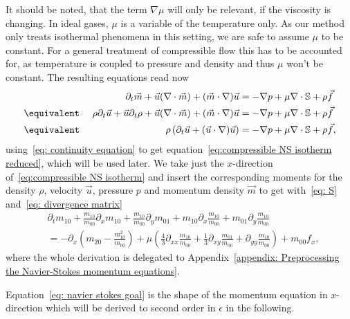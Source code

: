 It should be noted, that the term $\nabla \mu$ will only be relevant, if the viscosity is changing.
In ideal gases, $\mu$ is a variable of the temperature only.
As our method only treats isothermal phenomena in this setting, we are safe to assume $\mu$ to be constant.
For a general treatment of compressible flow this has to be accounted for, as temperature is coupled to pressure and density and thus $\mu$ won't be constant.
The resulting equations read now
\begin{alignat}{3}
  \label{eq:compressible NS isotherm}
  &&\partial_t \vec{m} + \vec{u}(\nabla \cdot \vec{m}) + (\vec{m} \cdot \nabla)\vec{u}
    &= - \nabla p + \mu \nabla \cdot \mathbb{S} + \rho \vec{f}\\
  \nonumber
  &\equivalent\ & \rho\partial_t \vec{u} + \vec{u}\partial_t \rho + \vec{u}(\nabla \cdot \vec{m}) + (\vec{m} \cdot \nabla)\vec{u}
    &= - \nabla p + \mu \nabla \cdot \mathbb{S} + \rho \vec{f}\\
  \label{eq:compressible NS isotherm reduced}
  &\equivalent& \rho\left(\partial_t \vec{u} + (\vec{u} \cdot \nabla)\vec{u}\right)
    &= - \nabla p + \mu \nabla \cdot \mathbb{S} + \rho \vec{f},
\end{alignat}
using~\eqref{eq: continuity equation} to get equation~\eqref{eq:compressible NS isotherm reduced}, which will be used later.
We take just the $x$-direction of~\eqref{eq:compressible NS isotherm} and insert the corresponding moments for the density $\rho$, velocity $\vec{u}$, pressure $p$ and momentum density $\vec{m}$ to get with~\eqref{eq: S} and~\eqref{eq: divergence matrix}
\begin{equation}
  \label{eq: navier stokes goal}
  \begin{aligned}
    & \partial_t m_{10}
    + \frac{m_{10}}{m_{00}} \partial_x m_{10}
    + \frac{m_{10}}{m_{00}}\partial_y m_{01}
    + m_{10} \partial_x \frac{m_{10}}{m_{00}}
    + m_{01} \partial_y \frac{m_{10}}{m_{00}}
     \\
    & =
    - \partial_x \left(m_{20} - \frac{ m_{10}^2 }{ m_{00} } \right)
     + \mu \left(\frac{4}{3}\partial_{xx}\frac{m_{10}}{m_{00}}
            + \frac{1}{3}\partial_{xy} \frac{m_{01}}{m_{00}}
            + \partial_{yy} \frac{m_{10}}{m_{00}} \right) + m_{00}f_x,
  \end{aligned}
\end{equation}
where the whole derivation is delegated to Appendix~\ref{appendix: Preprocessing the Navier-Stokes momentum equations}.

Equation~\eqref{eq: navier stokes goal} is the shape of the momentum equation in $x$-direction which will be derived to second order in $\epsilon$ in the following.
